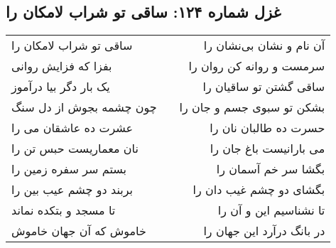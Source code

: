 \begin{center}
\section*{غزل شماره ۱۲۴: ساقی تو شراب لامکان را}
\label{sec:0124}
\begin{longtable}{l p{0.5cm} r}
ساقی تو شراب لامکان را
&&
آن نام و نشان بی‌نشان را
\\
بفزا که فزایش روانی
&&
سرمست و روانه کن روان را
\\
یک بار دگر بیا درآموز
&&
ساقی گشتن تو ساقیان را
\\
چون چشمه بجوش از دل سنگ
&&
بشکن تو سبوی جسم و جان را
\\
عشرت ده عاشقان می را
&&
حسرت ده طالبان نان را
\\
نان معماریست حبس تن را
&&
می بارانیست باغ جان را
\\
بستم سر سفره زمین را
&&
بگشا سر خم آسمان را
\\
بربند دو چشم عیب بین را
&&
بگشای دو چشم غیب دان را
\\
تا مسجد و بتکده نماند
&&
تا نشناسیم این و آن را
\\
خاموش که آن جهان خاموش
&&
در بانگ درآرد این جهان را
\\
\end{longtable}
\end{center}
